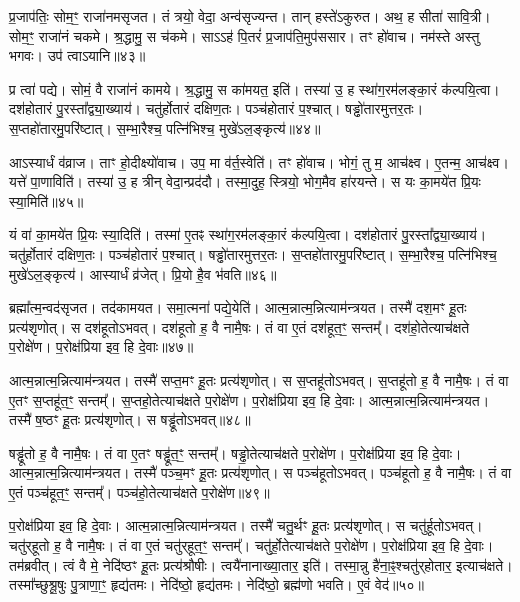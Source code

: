 प्र॒जा\-प॑तिः॒ सोम॒ꣳ॒ राजा॑नम\-सृजत।
तं त्रयो॒ वेदा॒ अन्व॑सृज्यन्त।
तान् हस्ते॑\-ऽकुरुत।
अथ॒ ह सीता॑ सावि॒त्री।
सोम॒ꣳ॒ राजा॑नं चकमे।
श्र॒द्धामु॒ स च॑कमे।
साऽऽह॑ पि॒तरं॑ प्र॒जा\-प॑ति॒मुप॑ससार।
तꣳ हो॑वाच।
नम॑स्ते अस्तु भगवः।
उप॑ त्वा\-ऽयानि॥४३॥\ip

प्र त्वा॑ पद्ये।
सोमं॒ वै राजा॑नं कामये।
श्र॒द्धामु॒ स का॑मयत॒ इति॑।
तस्या॑ उ॒ ह स्था॑ग॒रम॑लङ्का॒रं क॑ल्पयि॒त्वा।
दश॑होतारं पु॒रस्ता᳚द्व्या॒ख्याय॑।
चतु॑र्\mbox{}होतारं दक्षिण॒तः।
पञ्च॑होतारं प॒श्चात्।
षड्ढो॑तारमुत्तर॒तः।
स॒प्तहो॑तारमु॒परि॑ष्टात्।
स॒म्भा॒रैश्च॒ पत्नि॑भिश्च॒ मुखे॑\-ऽल॒ङ्कृत्य॑॥४४॥\ip

आऽस्यार्धं व॑व्राज।
ताꣳ हो॒दीक्ष्यो॑वाच।
उप॒ मा व॑र्त॒स्वेति॑।
तꣳ हो॑वाच।
भोगं॒ तु म॒ आच॑क्ष्व।
ए॒तन्म॒ आच॑क्ष्व।
यत्ते॑ पा॒णाविति॑।
तस्या॑ उ॒ ह त्रीन् वेदा॒न्प्रद॑दौ।
तस्मा॒दुह॒ स्त्रियो॒ भोग॒मैव हा॑रयन्ते।
स यः का॒मये॑त प्रि॒यः स्या॒मिति॑॥४५॥\ip

यं वा॑ का॒मये॑त प्रि॒यः स्या॒दिति॑।
तस्मा॑ ए॒तꣴ स्था॑ग॒रम॑लङ्का॒रं क॑ल्पयि॒त्वा।
दश॑होतारं पु॒रस्ता᳚द्व्या॒ख्याय॑।
चतु॑र्\mbox{}होतारं दक्षिण॒तः।
पञ्च॑होतारं प॒श्चात्।
षड्ढो॑तारमुत्तर॒तः।
स॒प्तहो॑तारमु॒परि॑ष्टात्।
स॒म्भा॒रैश्च॒ पत्नि॑भिश्च॒ मुखे॑\-ऽल॒ङ्कृत्य॑।
आस्यार्धं व्र॑जेत्।
प्रि॒यो है॒व भ॑वति॥४६॥\ip\anuvakamend[अ॒या॒न्य॒ल॒ङ्कृत्य॑ स्या॒मिति॑ भवति]

ब्रह्मा᳚त्म॒न्वद॑\-सृजत।
तद॑कामयत।
समा॒त्मना॑ पद्ये॒येति॑।
आत्म॒न्नात्म॒न्नित्याम॑न्त्रयत।
तस्मै॑ दश॒मꣳ हू॒तः प्रत्य॑शृणोत्।
स दश॑हूतो\-ऽभवत्।
दश॑हूतो ह॒ वै नामै॒षः।
तं वा ए॒तं दश॑हूत॒ꣳ॒ सन्तम्᳚।
दश॑हो॒तेत्याच॑क्षते प॒रोक्षे॑ण।
प॒रोक्ष॑प्रिया इव॒ हि दे॒वाः॥४७॥\ip

आत्म॒न्नात्म॒न्नित्याम॑न्त्रयत।
तस्मै॑ सप्त॒मꣳ हू॒तः प्रत्य॑शृणोत्।
स स॒प्तहू॑तो\-ऽभवत्।
स॒प्तहू॑तो ह॒ वै नामै॒षः।
तं वा ए॒तꣳ स॒प्तहू॑त॒ꣳ॒ सन्तम्᳚।
स॒प्तहो॒तेत्याच॑क्षते प॒रोक्षे॑ण।
प॒रोक्ष॑प्रिया इव॒ हि दे॒वाः।
आत्म॒न्नात्म॒न्नित्याम॑न्त्रयत।
तस्मै॑ ष॒ष्ठꣳ हू॒तः प्रत्य॑शृणोत्।
स षड्ढू॑तो\-ऽभवत्॥४८॥\ip

षड्ढू॑तो ह॒ वै नामै॒षः।
तं वा ए॒तꣳ षड्ढू॑त॒ꣳ॒ सन्तम्᳚।
षड्ढो॒तेत्याच॑क्षते प॒रोक्षे॑ण।
प॒रोक्ष॑प्रिया इव॒ हि दे॒वाः।
आत्म॒न्नात्म॒न्नित्याम॑न्त्रयत।
तस्मै॑ पञ्च॒मꣳ हू॒तः प्रत्य॑शृणोत्।
स पञ्च॑हूतो\-ऽभवत्।
पञ्च॑हूतो ह॒ वै नामै॒षः।
तं वा ए॒तं पञ्च॑हूत॒ꣳ॒ सन्तम्᳚।
पञ्च॑हो॒तेत्याच॑क्षते प॒रोक्षे॑ण॥४९॥\ip

प॒रोक्ष॑प्रिया इव॒ हि दे॒वाः।
आत्म॒न्नात्म॒न्नित्याम॑न्त्रयत।
तस्मै॑ चतु॒र्थꣳ हू॒तः प्रत्य॑शृणोत्।
स चतु॑र्\mbox{}हूतो\-ऽभवत्।
चतु॑र्‌\mbox{}हूतो ह॒ वै नामै॒षः।
तं वा ए॒तं चतु॑र्‌\mbox{}हूत॒ꣳ॒ सन्तम्᳚।
चतु॑र्हो॒तेत्याच॑क्षते प॒रोक्षे॑ण।
प॒रोक्ष॑प्रिया इव॒ हि दे॒वाः।
तम॑ब्रवीत्।
त्वं वै मे॒ नेदि॑ष्ठꣳ हू॒तः प्रत्य॑श्रौषीः।
त्वयै॑नानाख्या॒तार॒ इति॑।
तस्मा॒न्नु है॑ना॒ꣴ॒श्चतु॑र्‌\mbox{}होतार॒ इत्याच॑क्षते।
तस्मा᳚च्छुश्रू॒षुः पु॒त्राणा॒ꣳ॒ हृद्य॑तमः।
नेदि॑ष्ठो॒ हृद्य॑तमः।
नेदि॑ष्ठो॒ ब्रह्म॑णो भवति। ए॒वं वेद॑॥५०॥\ip\anuvakamend[दे॒वाः षड्ढू॑तो\-ऽभव॒त्पञ्च॑हो॒तेत्याच॑क्षते प॒रोक्षे॑णाश्रौषीः॒ षट्च॑]



